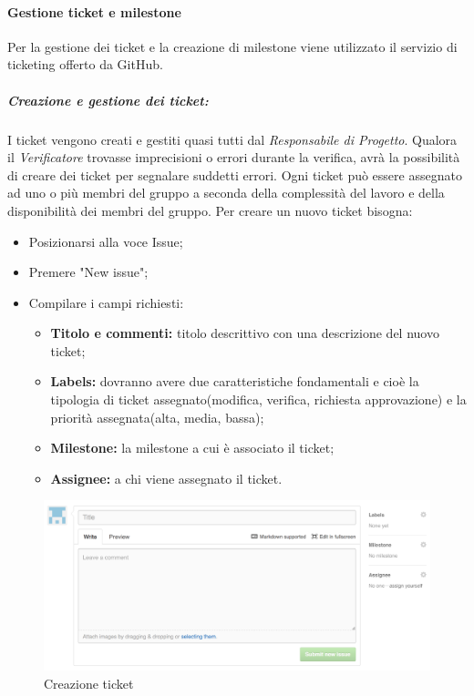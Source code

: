 \newpage
		\paragraph{Gestione ticket e milestone} \label{ticket}
		Per la gestione dei ticket e la creazione di milestone viene utilizzato il servizio di ticketing offerto da GitHub. 
		\subparagraph{Creazione e gestione dei ticket:} 
		
		I \gls{ticket} vengono creati e gestiti quasi tutti dal \textit{Responsabile di Progetto}.
		Qualora il \textit{Verificatore} trovasse imprecisioni o errori durante la verifica, avrà la possibilità di creare dei \gls{ticket} per segnalare suddetti errori.
		Ogni \gls{ticket} può essere assegnato ad uno o più membri del gruppo a seconda della complessità del lavoro e della disponibilità dei membri del gruppo.
		Per creare un nuovo \gls{ticket} bisogna:
		
		\begin{itemize}
			\item Posizionarsi alla voce Issue;
			\item Premere "New issue";
			\item Compilare i campi richiesti:
			\begin{itemize}
				\item \textbf{Titolo e commenti:} titolo descrittivo con una descrizione del nuovo \gls{ticket};
				\item \textbf{Labels:} dovranno avere due caratteristiche fondamentali e cioè la tipologia di \gls{ticket} assegnato(modifica, verifica, richiesta approvazione) e la priorità assegnata(alta, media, bassa);
				\item \textbf{\gls{Milestone}:} la \gls{milestone} a cui è associato il \gls{ticket};
				\item \textbf{Assignee:} a chi viene assegnato il \gls{ticket}.
			\end{itemize}
		\end{itemize}
		\begin{figure}[h]
			\centering
			\includegraphics[width=1\linewidth]{img/ticket}
			\caption[Creazione ticket]{Creazione ticket}
			\label{fig:ticket}
		\end{figure}
		
